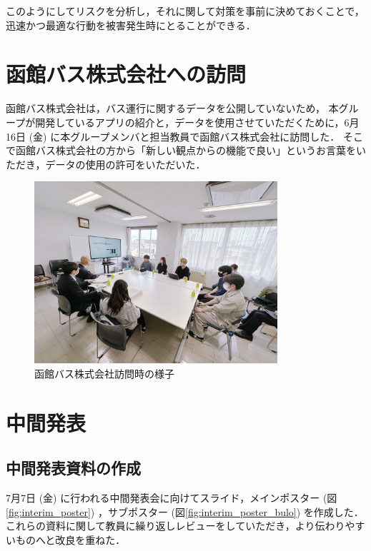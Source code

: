 このようにしてリスクを分析し，それに関して対策を事前に決めておくことで，迅速かつ最適な行動を被害発生時にとることができる．

\section{函館バス株式会社への訪問}
函館バス株式会社は，バス運行に関するデータを公開していないため，
本グループが開発しているアプリの紹介と，データを使用させていただくために，6月16日 (金) に本グループメンバと担当教員で函館バス株式会社に訪問した．
そこで函館バス株式会社の方から「新しい観点からの機能で良い」というお言葉をいただき，データの使用の許可をいただいた．

\begin{figure}[H]
    \centering
    \includegraphics[width=9cm]{images/hakodate_bus.png}
    \caption{函館バス株式会社訪問時の様子}
    \label{fig:hakodate_bus}
\end{figure}

\section{中間発表}
\subsection{中間発表資料の作成}
7月7日 (金) に行われる中間発表会に向けてスライド，メインポスター (図\ref{fig:interim_poster}) ，サブポスター (図\ref{fig:interim_poster_bulo}) を作成した．これらの資料に関して教員に繰り返しレビューをしていただき，より伝わりやすいものへと改良を重ねた．

